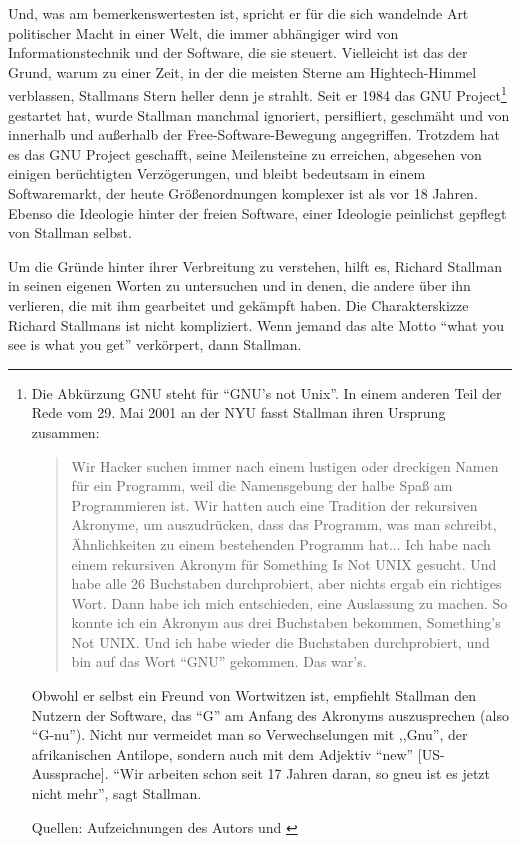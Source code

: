 Und, was am bemerkenswertesten ist, spricht er für die sich wandelnde Art politischer Macht in einer Welt, die immer abhängiger wird von Informationstechnik und der Software, die sie steuert.
Vielleicht ist das der Grund, warum zu einer Zeit, in der die meisten Sterne am Hightech-Himmel verblassen, Stallmans Stern heller denn je strahlt. Seit er 1984 das GNU Project\footnote{Die Abkürzung GNU steht für "`GNU's not Unix"'. In einem anderen Teil der Rede vom 29. Mai 2001 an der NYU fasst Stallman ihren Ursprung zusammen:
\begin{quote}
Wir Hacker suchen immer nach einem lustigen oder dreckigen Namen für ein Programm, weil die Namensgebung der halbe Spaß am Programmieren ist. Wir hatten auch eine Tradition der rekursiven Akronyme, um auszudrücken, dass das Programm, was man schreibt, Ähnlichkeiten zu einem bestehenden Programm hat... Ich habe nach einem rekursiven Akronym für Something Is Not UNIX gesucht. Und habe alle 26 Buchstaben durchprobiert, aber nichts ergab ein richtiges Wort. Dann habe ich mich entschieden, eine Auslassung zu machen. So konnte ich ein Akronym aus drei Buchstaben bekommen, Something's Not UNIX. Und ich habe wieder die Buchstaben durchprobiert, und bin auf das Wort "`GNU"' gekommen. Das war's.
\end{quote}

Obwohl er selbst ein Freund von Wortwitzen ist, empfiehlt Stallman den Nutzern der Software, das "`G"' am Anfang des Akronyms auszusprechen (also "`G-nu"'). Nicht nur vermeidet man so Verwechselungen mit ,,Gnu'', der afrikanischen Antilope, sondern auch mit dem Adjektiv "`new"' [US-Aussprache]. "`Wir arbeiten schon seit 17 Jahren daran, so gneu ist es jetzt nicht mehr"', sagt Stallman.

Quellen: Aufzeichnungen des Autors und \cite[Online-Mitschrift von][]{rmsnyu} }
gestartet hat, wurde Stallman manchmal ignoriert, persifliert, geschmäht und von innerhalb und außerhalb der Free-Software-Bewegung angegriffen. Trotzdem hat es das GNU Project geschafft, seine Meilensteine zu erreichen, abgesehen von einigen berüchtigten Verzögerungen, und bleibt bedeutsam in einem Softwaremarkt, der heute Größenordnungen komplexer ist als vor 18 Jahren. Ebenso die Ideologie hinter der freien Software, einer Ideologie peinlichst gepflegt von Stallman selbst.

Um die Gründe hinter ihrer Verbreitung zu verstehen, hilft es, Richard Stallman in seinen eigenen Worten zu untersuchen und in denen, die andere über ihn verlieren, die mit ihm gearbeitet und gekämpft haben. Die Charakterskizze Richard Stallmans ist nicht kompliziert. Wenn jemand das alte Motto "`what you see is what you get"' verkörpert, dann Stallman.

